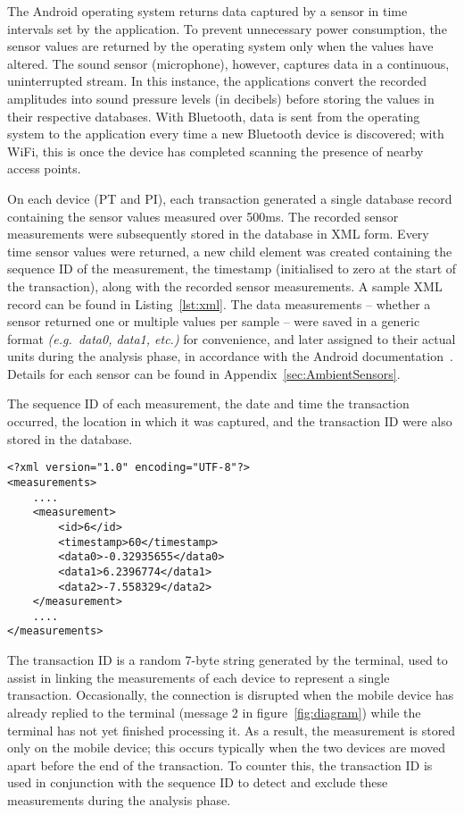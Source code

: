 \documentclass{article}
\begin{document}
The Android operating system returns data captured by a sensor in time intervals set by the application.  To prevent unnecessary power consumption, the sensor values are returned by the operating system only when the values have altered.  The sound sensor (microphone), however, captures data in a continuous, uninterrupted stream.  In this instance, the applications convert the recorded amplitudes into sound pressure levels (in decibels) before storing the values in their respective databases.
With Bluetooth, data is sent from the operating system to the application every time a new Bluetooth device is discovered; with WiFi, this is once the device has completed scanning the presence of nearby access points.

On each device (PT and PI), each transaction generated a single database record containing the sensor values measured over 500ms.
The recorded sensor measurements were subsequently stored in the database in XML form. Every time sensor values were returned, a new child element was created containing the sequence ID of the measurement, the timestamp (initialised to zero at the start of the transaction), along with the recorded sensor measurements.  A sample XML record can be found in Listing~\ref{lst:xml}.
The data measurements -- whether a sensor returned one or multiple values per sample -- were saved in a generic format \textit{(e.g.\ data0, data1, etc.)} for convenience, and later assigned to their actual units during the analysis phase, in accordance with the Android documentation~\cite{sensorUnits}.
Details for each sensor can be found in Appendix~\ref{sec:AmbientSensors}.

The sequence ID of each measurement, the date and time the transaction occurred, the location in which it was captured, and the transaction ID were also stored in the database.

\begin{lstlisting}[style=listXML, caption={Sample XML Record}, label={lst:xml}, float, floatplacement=H]
<?xml version="1.0" encoding="UTF-8"?>
<measurements>
	....
	<measurement>
		<id>6</id>
		<timestamp>60</timestamp>
		<data0>-0.32935655</data0>
		<data1>6.2396774</data1>
		<data2>-7.558329</data2>
	</measurement>
	....
</measurements>
\end{lstlisting}

The transaction ID is a random 7-byte string generated by the terminal, used to assist in linking the measurements of each device to represent a single transaction.
Occasionally, the connection is disrupted when the mobile device has already replied to the terminal (message 2 in figure~\ref{fig:diagram}) while the terminal has not yet finished processing it.  As a result, the measurement is stored only on the mobile device; this occurs typically when the two devices are moved apart before the end of the transaction.  To counter this, the transaction ID is used in conjunction with the sequence ID to detect and exclude these measurements during the analysis phase.
\end{document}

